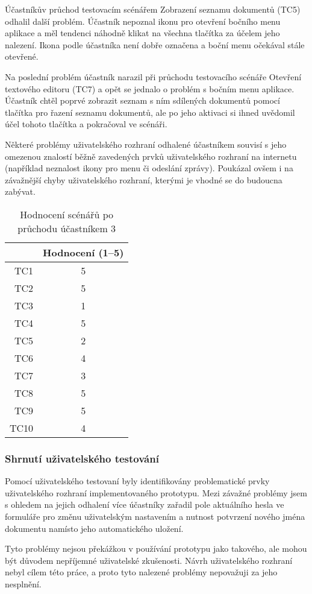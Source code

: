 Účastníkův průchod testovacím scénářem Zobrazení seznamu dokumentů (TC5) odhalil další problém.
Účastník nepoznal ikonu pro otevření bočního menu aplikace a měl tendenci náhodně klikat na všechna tlačítka za účelem jeho nalezení.
Ikona podle účastníka není dobře označena a boční menu očekával stále otevřené.

Na poslední problém účastník narazil při průchodu testovacího scénáře Otevření textového editoru (TC7) a opět se jednalo o problém s bočním menu aplikace.
Účastník chtěl poprvé zobrazit seznam s ním sdílených dokumentů pomocí tlačítka pro řazení seznamu dokumentů, ale po jeho aktivaci si ihned uvědomil účel tohoto tlačítka a pokračoval ve scénáři.

Některé problémy uživatelského rozhraní odhalené účastníkem souvisí s jeho omezenou znalostí běžně zavedených prvků uživatelského rozhraní na internetu (například neznalost ikony pro menu či odeslání zprávy).
Poukázal ovšem i na závažnější chyby uživatelského rozhraní, kterými je vhodné se do budoucna zabývat.

\begin{table}[ht!]
    \centering
    \caption{Hodnocení scénářů po průchodu účastníkem 3}
    \label{tab:poPrůchoduÚčastníkem3}
    \begin{tabular}{r|c}
        & Hodnocení (1--5) \\ \hline
        TC1 & 5 \\
        TC2 & 5 \\
        TC3 & 1 \\
        TC4 & 5 \\
        TC5 & 2 \\
        TC6 & 4 \\
        TC7 & 3 \\
        TC8 & 5 \\
        TC9 & 5 \\
        TC10 & 4 \\
    \end{tabular}
\end{table}

\subsubsection{Shrnutí uživatelského testování}

Pomocí uživatelského testovaní byly identifikovány problematické prvky uživatelského rozhraní implementovaného prototypu.
Mezi závažné problémy jsem s ohledem na jejich odhalení více účastníky zařadil pole aktuálního hesla ve formuláře pro změnu uživatelským nastavením a nutnost potvrzení nového jména dokumentu namísto jeho automatického uložení.

Tyto problémy nejsou překážkou v používání prototypu jako takového, ale mohou být důvodem nepříjemné uživatelské zkušenosti.
Návrh uživatelského rozhraní nebyl cílem této práce, a proto tyto nalezené problémy nepovažuji za jeho nesplnění.

